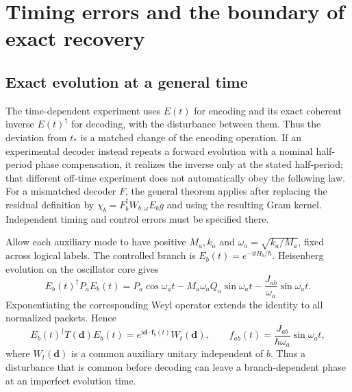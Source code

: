 \documentclass[aip,adv,reprint,onecolumn,amsmath,amssymb]{revtex4-2}
\newcommand{\ii}{\mathrm i}
\begin{document}
\section{Timing errors and the boundary of exact recovery}
\subsection{Exact evolution at a general time}
The time-dependent experiment uses $E(t)$ for encoding and its exact coherent inverse $E(t)^\dagger$ for decoding, with the disturbance between them. Thus the deviation from $t_*$ is a matched change of the encoding operation. If an experimental decoder instead repeats a forward evolution with a nominal half-period phase compensation, it realizes the inverse only at the stated half-period; that different off-time experiment does not automatically obey the following law. For a mismatched decoder $F$, the general theorem applies after replacing the residual definition by $\chi_b=F_b^\dagger W_{b,\omega}E_bg$ and using the resulting Gram kernel. Independent timing and control errors must be specified there.

Allow each auxiliary mode to have positive $M_a,k_a$ and $\omega_a=\sqrt{k_a/M_a}$, fixed across logical labels. The controlled branch is $E_b(t)=e^{-\ii tH_b/\hbar}$. Heisenberg evolution on the oscillator core gives
\begin{equation}
 E_b(t)^\dagger P_aE_b(t)=P_a\cos\omega_at-M_a\omega_aQ_a\sin\omega_at
 -\frac{J_{ab}}{\omega_a}\sin\omega_at.
 \label{eq:Heisenberg}
\end{equation}
Exponentiating the corresponding Weyl operator extends the identity to all normalized packets. Hence
\begin{equation}
 E_b(t)^\dagger T(\bm d)E_b(t)=e^{\ii\bm d\cdot\bm f_b(t)}W_t(\bm d),\qquad
 f_{ab}(t)=\frac{J_{ab}}{\hbar\omega_a}\sin\omega_at,
 \label{eq:time-commutation}
\end{equation}
where $W_t(\bm d)$ is a common auxiliary unitary independent of $b$. Thus a disturbance that is common before decoding can leave a branch-dependent phase at an imperfect evolution time.
\end{document}
